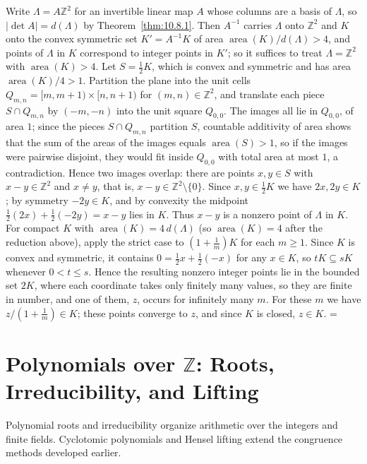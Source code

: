 \documentclass[11pt]{article}
\makeatletter
\theoremstyle{ntstyle}
\let\nt@closedisplay\]
\def\nt@guardedclose{\@ifnextchar\par{\nt@closeafterpar}{\@ifnextchar\end{\postdisplaypenalty\@M\nt@closedisplay}{\nt@closedisplay}}}
\def\nt@closeafterpar\par{\@ifnextchar\par{\nt@closeafterpar}{\@ifnextchar\end{\postdisplaypenalty\@M\nt@closedisplay\par}{\nt@closedisplay\par}}}
\renewenvironment{proof}[1][\proofname]{\par
  \pushQED{\qed}\normalfont\topsep\medskipamount\edef\nt@afterproof{\@endparpenalty=\the\@endparpenalty\relax}\@beginparpenalty\@M\@endparpenalty\@M\let\]\nt@guardedclose\trivlist\item[]\textit{#1\@addpunct{.}} \ignorespaces}{\ifvmode\addpenalty\@M\fi\popQED\nt@afterproof\endtrivlist\@endpefalse}
\DeclareMathOperator{\area}{area}
\makeatother
\begin{document}
\begin{proof} Write $\Lambda=A\mathbb{Z}^2$ for an
	invertible linear map $A$ whose columns are a basis of $\Lambda$, so
	$|\det A|=d(\Lambda)$ by Theorem~\ref{thm:10.8.1}. Then $A^{-1}$ carries $\Lambda$ onto
	$\mathbb{Z}^2$ and $K$ onto the convex symmetric set $K'=A^{-1}K$ of
	area $\area(K)/d(\Lambda)>4$, and points of $\Lambda$
	in $K$ correspond to integer points in $K'$; so it suffices to treat
	$\Lambda=\mathbb{Z}^2$ with $\area(K)>4$. Let
	$S=\tfrac{1}{2}K$, which is convex and symmetric and has area
	$\area(K)/4>1$. Partition the plane into the unit cells
	$Q_{m,n}=[m,m+1)\times[n,n+1)$ for $(m,n)\in\mathbb{Z}^2$, and
	translate each piece $S\cap Q_{m,n}$ by $(-m,-n)$ into the unit
	square $Q_{0,0}$. The images all lie in $Q_{0,0}$, of area $1$; since the pieces $S\cap Q_{m,n}$
	partition $S$, countable additivity of area shows that the sum of the areas of the images equals
	$\area(S)>1$, so if the images were pairwise disjoint, they would fit inside $Q_{0,0}$ with total
	area at most $1$, a contradiction. Hence two images overlap:
	there are points $x,y\in S$ with $x-y\in\mathbb{Z}^2$ and $x\neq y$,
	that is, $x-y\in\mathbb{Z}^2\setminus\{0\}$. Since $x,y\in\tfrac{1}{2}K$ we
	have $2x,2y\in K$; by symmetry $-2y\in K$, and by convexity the
	midpoint $\tfrac{1}{2}(2x)+\tfrac{1}{2}(-2y)=x-y$ lies in $K$. Thus $x-y$ is
	a nonzero point of $\Lambda$ in $K$. For compact $K$ with
	$\area(K)=4\,d(\Lambda)$ (so $\area(K)=4$ after the reduction above), apply the strict case to
	$(1+\tfrac{1}{m})K$ for each $m\ge1$. Since $K$ is convex and symmetric,
	it contains $0=\tfrac12x+\tfrac12(-x)$ for any $x\in K$, so $tK\subseteq sK$
	whenever $0<t\le s$. Hence the resulting nonzero integer points lie in the
	bounded set $2K$, where each coordinate takes only finitely many values,
	so they are finite in number, and one of them, $z$, occurs for infinitely
	many $m$. For these $m$ we have $z/(1+\tfrac{1}{m})\in K$; these points
	converge to $z$, and since $K$ is closed, $z\in K$.
\end{proof}
\clearpage

\section{Polynomials over \texorpdfstring{$\mathbb{Z}$}{Z}: Roots, Irreducibility, and Lifting}

Polynomial roots and irreducibility organize arithmetic over the integers and finite fields. Cyclotomic polynomials
and Hensel lifting extend the congruence methods developed earlier.
\end{document}
